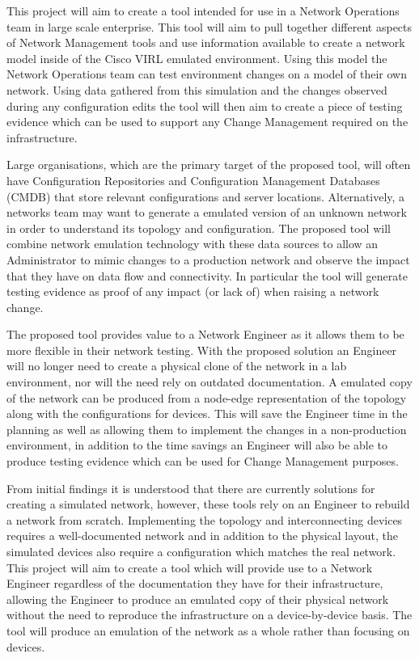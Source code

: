 \documentclass[11pt]{report}
\begin{document}
This project will aim to create a tool intended for use in a Network Operations team in large scale enterprise. This tool will aim to pull together different aspects of Network Management tools and use information available to create a network model inside of the Cisco VIRL emulated environment. Using this model the Network Operations team can test environment changes on a model of their own network. Using data gathered from this simulation and the changes observed during any configuration edits the tool will then aim to create a piece of testing evidence which can be used to support any Change Management required on the infrastructure.

Large organisations, which are the primary target of the proposed tool, will often have Configuration Repositories and Configuration Management Databases (CMDB) that store relevant configurations and server locations. Alternatively, a networks team may want to generate a emulated version of an unknown network in order to understand its topology and configuration. The proposed tool will combine network emulation technology with these data sources to allow an Administrator to mimic changes to a production network and observe the impact that they have on data flow and connectivity. In particular the tool will generate testing evidence as proof of any impact (or lack of) when raising a network change.

The proposed tool provides value to a Network Engineer as it allows them to be more flexible in their network testing. With the proposed solution an Engineer will no longer need to create a physical clone of the network in a lab environment, nor will the need rely on outdated documentation. A emulated copy of the network can be produced from a node-edge representation of the topology along with the configurations for devices. This will save the Engineer time in the planning as well as allowing them to implement the changes in a non-production environment, in addition to the time savings an Engineer will also be able to produce testing evidence which can be used for Change Management purposes.

From initial findings it is understood that there are currently solutions for creating a simulated network, however, these tools rely on an Engineer to rebuild a network from scratch. Implementing the topology and interconnecting devices requires a well-documented network and in addition to the physical layout, the simulated devices also require a configuration which matches the real network. This project will aim to create a tool which will provide use to a Network Engineer regardless of the documentation they have for their infrastructure, allowing the Engineer to produce an emulated copy of their physical network without the need to reproduce the infrastructure on a device-by-device basis. The tool will produce an emulation of the network as a whole rather than focusing on devices.
\end{document}
